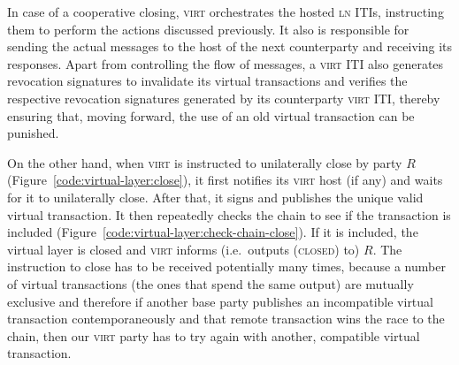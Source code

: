   In case of a cooperative closing, \textsc{virt} orchestrates the hosted
  \textsc{ln} ITIs, instructing them to perform the actions discussed
  previously. It also is responsible for sending the actual messages to the host
  of the next counterparty and receiving its responses. Apart from controlling
  the flow of messages, a \textsc{virt} ITI also generates revocation signatures
  to invalidate its virtual transactions and verifies the respective revocation
  signatures generated by its counterparty \textsc{virt} ITI, thereby ensuring
  that, moving forward, the use of an old virtual transaction can be punished.

  On the other hand, when \textsc{virt} is instructed to unilaterally close by party $R$
  (Figure~\ref{code:virtual-layer:close}), it first notifies its \textsc{virt}
  host (if any) and waits for it to unilaterally close. After that, it signs and
  publishes the unique valid virtual transaction. It then repeatedly checks the
  chain to see if the transaction is included
  (Figure~\ref{code:virtual-layer:check-chain-close}). If it is included, the
  virtual layer is closed and \textsc{virt} informs (i.e.\ outputs
  (\textsc{closed}) to) $R$. The instruction to close has to be received
  potentially many times, because a number of virtual transactions (the ones
  that spend the same output) are mutually exclusive and therefore if another
  base party publishes an incompatible virtual transaction contemporaneously and
  that remote transaction wins the race to the chain, then our \textsc{virt}
  party has to try again with another, compatible virtual transaction.

